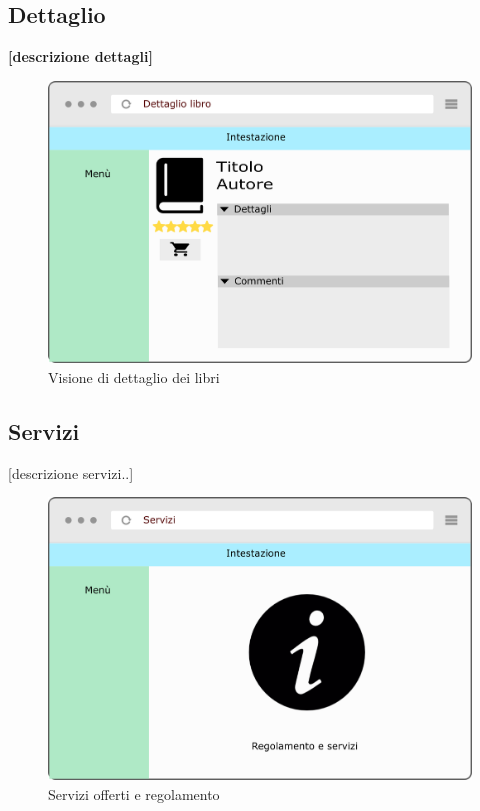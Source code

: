 \subsection{Dettaglio}
\textbf{[descrizione dettagli]}
\begin{figure}[H]
	\centering
	\includegraphics[width= 14cm]{immagini/dettaglio.png}
	\caption{Visione di dettaglio dei libri}
\end{figure}

\subsection{Servizi}
[descrizione servizi..]
\begin{figure}[H]
	\centering
	\includegraphics[width= 14cm]{immagini/servizi.png}
	\caption{Servizi offerti e regolamento}
\end{figure}

